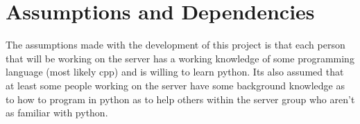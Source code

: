 \section{Assumptions and
Dependencies}\label{assumptions-and-dependencies}
The assumptions made with the development of this project is that each person that will be working on the server has a working knowledge of some programming language (most likely \gls{cpp}) and is willing to learn python. Its also assumed that at least some people working on the server have some background knowledge as to how to program in python as to help others within the server group who aren't as familiar with \gls{python}.

